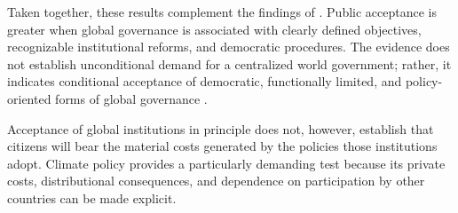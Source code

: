 Taken together, these results complement the findings of \citet{ghassim_who_2024}. Public acceptance is greater when global governance is associated with clearly defined objectives, recognizable institutional reforms, and democratic procedures. The evidence does not establish unconditional demand for a centralized world government; rather, it indicates conditional acceptance of democratic, functionally limited, and policy-oriented forms of global governance \citep{fabre_public_2026,ghassim_who_2024}.

Acceptance of global institutions in principle does not, however, establish that citizens will bear the material costs generated by the policies those institutions adopt. Climate policy provides a particularly demanding test because its private costs, distributional consequences, and dependence on participation by other countries can be made explicit.




